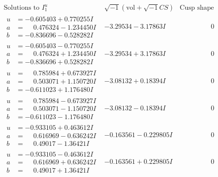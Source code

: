 \documentclass[1p]{elsarticle_modified}
\theoremstyle{definition}
\newcommand{\I}{\sqrt{-1}}
\begin{document}
$$\begin{array}{c|c|c}  
\text{Solutions to }I^u_{1}& \I (\text{vol} + \sqrt{-1}CS) & \text{Cusp shape}\\
 \hline 
\begin{aligned}
u &= -0.605403 + 0.770255 I \\
a &= \phantom{-}0.476324 - 1.234450 I \\
b &= -0.836696 - 0.528282 I\end{aligned}
 & -3.29534 - 3.17863 I & \phantom{-0.000000 } 0 \\ \hline\begin{aligned}
u &= -0.605403 - 0.770255 I \\
a &= \phantom{-}0.476324 + 1.234450 I \\
b &= -0.836696 + 0.528282 I\end{aligned}
 & -3.29534 + 3.17863 I & \phantom{-0.000000 } 0 \\ \hline\begin{aligned}
u &= \phantom{-}0.785984 + 0.673927 I \\
a &= \phantom{-}0.503071 + 1.150720 I \\
b &= -0.611023 + 1.176480 I\end{aligned}
 & -3.08132 + 0.18394 I & \phantom{-0.000000 } 0 \\ \hline\begin{aligned}
u &= \phantom{-}0.785984 - 0.673927 I \\
a &= \phantom{-}0.503071 - 1.150720 I \\
b &= -0.611023 - 1.176480 I\end{aligned}
 & -3.08132 - 0.18394 I & \phantom{-0.000000 } 0 \\ \hline\begin{aligned}
u &= -0.933105 + 0.463612 I \\
a &= \phantom{-}0.616969 - 0.636242 I \\
b &= \phantom{-}0.49017 - 1.36421 I\end{aligned}
 & -0.163561 - 0.229805 I & \phantom{-0.000000 } 0 \\ \hline\begin{aligned}
u &= -0.933105 - 0.463612 I \\
a &= \phantom{-}0.616969 + 0.636242 I \\
b &= \phantom{-}0.49017 + 1.36421 I\end{aligned}
 & -0.163561 + 0.229805 I & \phantom{-0.000000 } 0 \\ \hline\begin{aligned}

\end{aligned}
\end{array}$$
\end{document}
